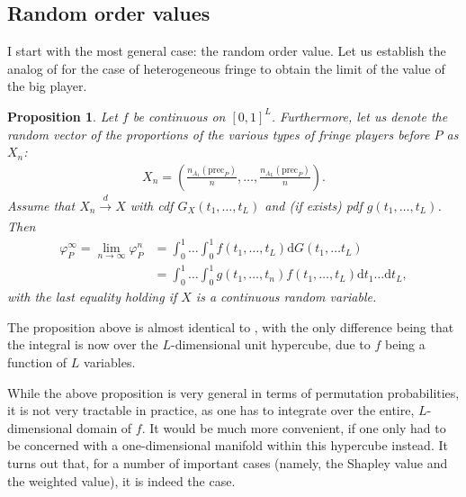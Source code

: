 \documentclass[a4paper]{article}
\newtheorem{proposition}{Proposition}
\newcommand{\dt}{\mathrm{d}t}
\newcommand{\dG}{\mathrm{d}G}
\newcommand{\precede}{\mathrm{prec}}
\begin{document}
\subsection{Random order values}

I start with the most general case: the random order value.
Let us establish the analog of  for the case of heterogeneous fringe to obtain the limit of the value of the big player.
\begin{proposition}
    \label{prop:many_sided_general}
    Let $f$ be continuous on $[0, 1]^L$. Furthermore, let us denote the random vector of the proportions of the various types of fringe players before $P$ as $X_n$:
    \begin{align*}
        X_n = \left( \frac{n_{A_1}(\precede_P)}{n}, \dots, \frac{n_{A_L}(\precede_P)}{n} \right).
    \end{align*}
    Assume that $X_n \xrightarrow[]{d} X$ with cdf $G_X(t_1, \dots, t_L)$ and (if exists) pdf $g(t_1, \dots, t_L)$.
    Then
    \begin{align*}
        \varphi_P^\infty = \lim_{n \to \infty} \varphi_P^n &= \int_0^1 \dots \int_0^1 f(t_1, \dots, t_L) \dG(t_1, \dots t_L) \\
        &= \int_0^1\dots \int_0^1 g(t_1, \dots, t_n) f(t_1, \dots, t_L) \dt_1 \dots \dt_L,
    \end{align*}
    with the last equality holding if $X$ is a continuous random variable.
\end{proposition}
The proposition above is almost identical to , with the only difference being that the integral is now over the $L$-dimensional unit hypercube, due to $f$ being a function of $L$ variables.

While the above proposition is very general in terms of permutation probabilities, it is not very tractable in practice, as one has to integrate over the entire, $L$-dimensional domain of $f$.
It would be much more convenient, if one only had to be concerned with a one-dimensional manifold within this hypercube instead.
It turns out that, for a number of important cases (namely, the Shapley value and the weighted value), it is indeed the case.
\end{document}
